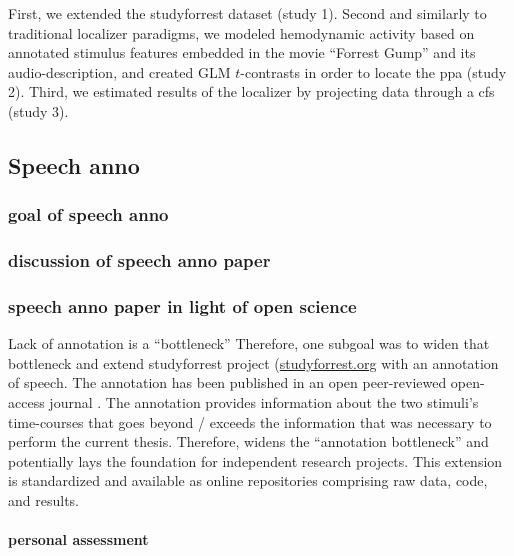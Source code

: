
%
First, we extended the studyforrest dataset (study 1).
%
Second  and similarly to traditional localizer paradigms, we modeled hemodynamic
activity based on annotated stimulus features embedded in the movie ``Forrest
Gump'' and its audio-description, and created GLM $t$-contrasts in order to
locate the \ac{ppa} (study 2).
%
Third, we estimated results of the localizer by projecting data through a
\ac{cfs} (study 3).


\subsection{Speech anno}

\subsubsection{goal of speech anno}

\subsubsection{discussion of speech anno paper}

\subsubsection{speech anno paper in light of open science}

Lack of annotation is a ``bottleneck'' \citep{aliko2020naturalistic}
Therefore, one subgoal was to widen that bottleneck and extend studyforrest
project (\href{www.studyforrest.org}{\url{studyforrest.org}} with an annotation
of speech.
The annotation has been published in an open peer-reviewed open-access journal
\citep{haeusler2021speechanno}.
%
The annotation provides information about the two stimuli's time-courses that
goes beyond / exceeds the information that was necessary to perform the current
thesis.
%
Therefore, widens the ``annotation bottleneck'' and potentially lays
the foundation for independent research projects.
%
This extension is standardized and available as online repositories comprising
raw data, code, and results.

\paragraph{personal assessment}

